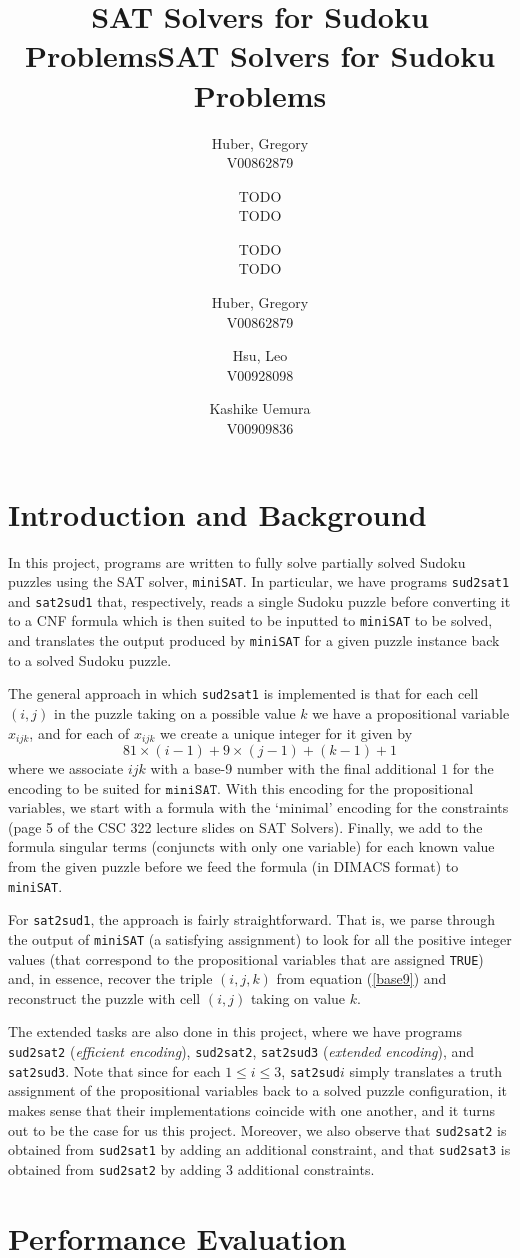 \documentclass[12pt]{article}
\title{SAT Solvers for Sudoku Problems}
\author{
  Huber, Gregory \\
  V00862879
  \and
  TODO \\
  TODO
  \and
  TODO \\
  TODO
}
\title{SAT Solvers for Sudoku Problems}
\author{
  Huber, Gregory \\
  V00862879
  \and
  Hsu, Leo \\
  V00928098
  \and
  Kashike Uemura \\
  V00909836
}
\begin{document}
\maketitle

\section{Introduction and Background}

\indent In this project, programs are written to fully solve partially solved Sudoku puzzles using the SAT solver, \texttt{miniSAT}. In particular, we have programs \texttt{sud2sat1} and \texttt{sat2sud1} that, respectively, reads a single Sudoku puzzle before converting it to a CNF formula which is then suited to be inputted to \texttt{miniSAT} to be solved, and translates the output produced by \texttt{miniSAT} for a given puzzle instance back to a solved Sudoku puzzle.
\newline

The general approach in which \texttt{sud2sat1} is implemented is that for each cell $(i, j)$ in the puzzle taking on a possible value $k$ we have a propositional variable $x_{ijk}$, and for each of $x_{ijk}$ we create a unique integer for it given by
\begin{equation}\label{base9}
81 \times (i-1) + 9 \times (j-1) + (k-1) + 1
\end{equation}
where we associate $ijk$ with a base-9 number with the final additional $1$ for the encoding to be suited for $\texttt{miniSAT}$. With this encoding for the propositional variables, we start with a formula with the `minimal' encoding for the constraints (page 5 of the CSC 322 lecture slides on SAT Solvers). Finally, we add to the formula singular terms (conjuncts with only one variable) for each known value from the given puzzle before we feed the formula (in DIMACS format) to \texttt{miniSAT}.
\newline

For \texttt{sat2sud1}, the approach is fairly straightforward. That is, we parse through the output of \texttt{miniSAT} (a satisfying assignment) to look for all the positive integer values (that correspond to the propositional variables that are assigned \texttt{TRUE}) and, in essence, recover the triple $(i, j, k)$ from equation (\ref{base9}) and reconstruct the puzzle with cell $(i, j)$ taking on value $k$.
\newline

The extended tasks are also done in this project, where we have programs \texttt{sud2sat2} (\emph{efficient encoding}), \texttt{sud2sat2}, \texttt{sat2sud3} (\emph{extended encoding}), and \texttt{sat2sud3}. Note that since for each $1 \leq i \leq 3$, \texttt{sat2sud}$i$ simply translates a truth assignment of the propositional variables back to a solved puzzle configuration, it makes sense that their implementations coincide with one another, and it turns out to be the case for us this project. Moreover, we also observe that \texttt{sud2sat2} is obtained from \texttt{sud2sat1} by adding an additional constraint, and that \texttt{sud2sat3} is obtained from \texttt{sud2sat2} by adding 3 additional constraints.

\section{Performance Evaluation}
\end{document}
